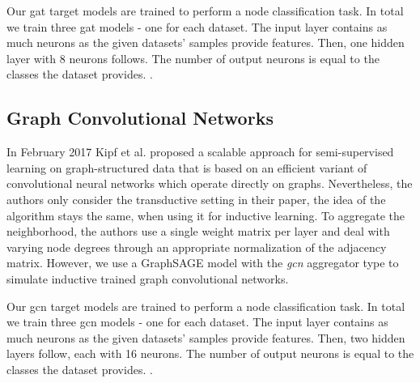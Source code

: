       Our gat target models are trained to perform a node classification task.
      In total we train three gat models - one for each dataset.
      The input layer contains as much neurons as the given datasets' samples provide features.
      Then, one hidden layer with 8 neurons follows.
      The number of output neurons is equal to the classes the dataset provides.
      .

    \subsection*{Graph Convolutional Networks}
      In February 2017 Kipf et al. \cite{gcn} proposed a scalable approach for semi-supervised learning on graph-structured data that is based on an efficient variant of convolutional neural networks which operate directly on graphs.
      Nevertheless, the authors only consider the transductive setting in their paper, the idea of the algorithm stays the same, when using it for inductive learning.
      To aggregate the neighborhood, the authors use a single weight matrix per layer and deal with varying node degrees through an appropriate normalization of the adjacency matrix.
      However, we use a GraphSAGE model with the \emph{gcn} aggregator type to simulate inductive trained graph convolutional networks.

      Our gcn target models are trained to perform a node classification task.
      In total we train three gcn models - one for each dataset.
      The input layer contains as much neurons as the given datasets' samples provide features.
      Then, two hidden layers follow, each with 16 neurons.
      The number of output neurons is equal to the classes the dataset provides.
      . 

